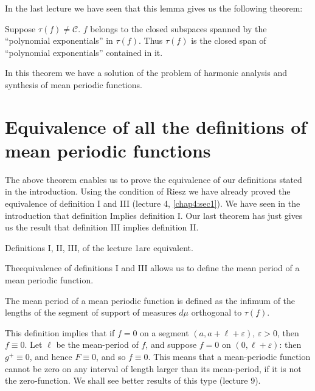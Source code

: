 In the last lecture we have seen that this lemma gives us the
following theorem: 
\begin{theorem*}
 Suppose $\tau (f) \neq \mathscr{C}$. $f$ belongs to the closed
 subspaces span\-ned by the ``polynomial exponentials'' in $\tau
 (f)$. Thus $\tau (f) $ is the closed span of ``polynomial
 exponentials'' contained in it. 
\end{theorem*}

In this theorem we have a solution of the problem of harmonic
analysis and synthesis of mean periodic functions. 

\section[Equivalence of all the definitions of...]{Equivalence of all the 
definitions of mean periodic functions}\label{chap5:sec2}%

The above theorem enables us to prove the equivalence of our
definitions stated in the introduction. Using the condition of Riesz
we have already proved the equivalence of definition I and III
(lecture 4, \ref{chap4:sec1}). We have seen in the introduction that definition
Implies definition I. Our last theorem has just gives us the result
that definition III implies definition II. 
\begin{theorem*}
 Definitions I, II, III, of the lecture 1are equivalent.
\end{theorem*}

The\pageoriginale equivalence of definitions I and III allows us to define the mean
period of a mean periodic function. 
\begin{defi*}
 The mean period of a mean periodic function is defined as the
 infimum of the lengths of the segment of support of measures $d \mu$
 orthogonal to $\tau(f)$. 
\end{defi*}

\begin{remark*}
 This definition implies that if $f = 0$ on a segment $(a, a+ \ell +
 \varepsilon)$, $\varepsilon > 0$, then $f \equiv 0$. Let $\ell$ be
 the mean-period of $f$, and suppose $f =0$ on $(0, \ell +
 \varepsilon )$: then $g^+ \equiv 0$, and hence $F \equiv 0$, and so
 $f \equiv 0$. This means that a mean-periodic function cannot be
 zero on any interval of length larger than its mean-period, if it is
 not the zero-function. We shall see better results of this type
 (lecture 9). 
\end{remark*}

